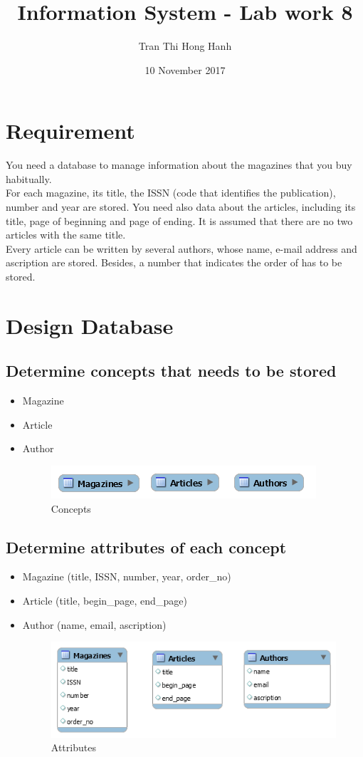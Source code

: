 \documentclass{article}
\title{Information System - Lab work 8}
\author{Tran Thi Hong Hanh}
\date{10 November 2017}
\begin{document}
\maketitle
\section{Requirement}
You need a database to manage information about the magazines that you buy habitually.\\
For each magazine, its title, the ISSN (code that identifies the publication), number and year are stored. You need also data about the articles, including its title, page of beginning and page of ending. It is assumed that there are no two articles with the same title.\\
Every article can be written by several authors, whose name, e-mail address and ascription are stored. Besides, a number that indicates the order of has to be stored.
\section{Design Database}
\subsection{Determine concepts that needs to be stored}
\begin{itemize}
	\item Magazine
	\item Article
	\item Author
\begin{figure}[h]
\centering
\includegraphics[scale = 1]{1.PNG}
\caption{Concepts}
\end{figure}
\end{itemize}
\subsection{Determine attributes of each concept}
\begin{itemize}
	\item Magazine (title, ISSN, number, year, order\_no)
	\item Article (title, begin\_page, end\_page) 
	\item Author (name, email, ascription)
\begin{figure}[h]
\centering
\includegraphics[scale = 1]{2.PNG}
\caption{Attributes}
\end{figure}
\end{itemize}
\end{document}

